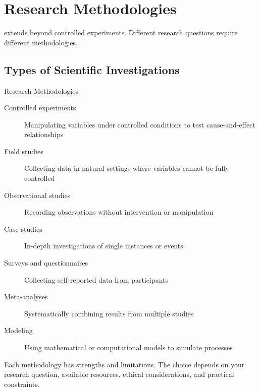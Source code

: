 \section{Research Methodologies}

 extends beyond controlled experiments. Different research questions require different methodologies.

\subsection{Types of Scientific Investigations}

\begin{keyconcept}{Research Methodologies}
\begin{description}
    \item[Controlled experiments] Manipulating variables under controlled conditions to test cause-and-effect relationships
    
    \item[Field studies] Collecting data in natural settings where variables cannot be fully controlled
    
    \item[Observational studies] Recording observations without intervention or manipulation
    
    \item[Case studies] In-depth investigations of single instances or events
    
    \item[Surveys and questionnaires] Collecting self-reported data from participants
    
    \item[Meta-analyses] Systematically combining results from multiple studies
    
    \item[Modeling] Using mathematical or computational models to simulate processes
\end{description}
\end{keyconcept}

Each methodology has strengths and limitations. The choice depends on your research question, available resources, ethical considerations, and practical constraints.


